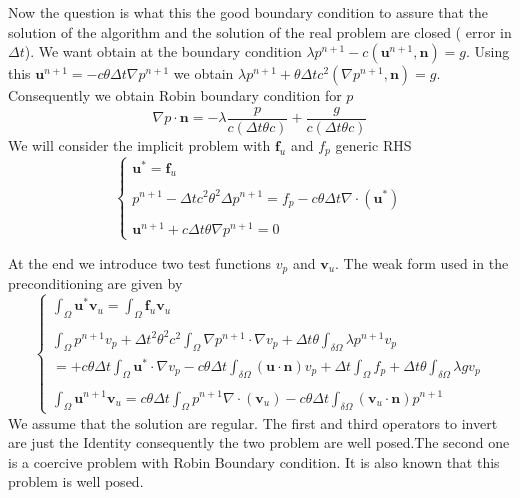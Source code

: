 \documentclass[a4paper,twoside,french,english,11pt]{article}
\newcommand{\ds}{\displaystyle}
\begin{document}
Now the question is what this the good boundary condition to assure that the solution of the algorithm and the solution of the real problem are closed ( error in $\Delta t$). We want obtain at the boundary condition
$\lambda p^{n+1}- c (\bm{u}^{n+1},\bm{n})=g$. Using this $\bm{u}^{n+1}=-c \theta \Delta t\nabla p^{n+1}$ we obtain $\lambda p^{n+1}+ \theta \Delta t c^2 (\nabla p^{n+1},\bm{n})=g$. Consequently we obtain Robin boundary condition for $p$
$$
\nabla p\cdot \bm{n}=-\lambda\frac{p}{c(\Delta t\theta c)}+\frac{g}{c(\Delta t\theta c)}
$$
We will consider the implicit problem with $\mathbf{f}_u$ and $f_p$ generic RHS
$$
\left\{\begin{array}{l}
\ds \bm{u}^{*}= \mathbf{f}_u\\
~\\
\ds p^{n+1}- \Delta t c^2\theta^2\Delta p^{n+1} = f_p-c\theta \Delta t\nabla \cdot (\bm{u}^*) \\
~\\
\ds \bm{u}^{n+1}+c\Delta t\theta \nabla p^{n+1} = 0 \end{array}\right.
$$


At the end we introduce two test functions $v_p$ and $\mathbf{v}_u$. The weak form used in the preconditioning are given by
$$\left\{\begin{array}{l}
\ds \int_{\Omega} \bm{u}^{*} \mathbf{v}_u = \int_{\Omega}\mathbf{f}_u \mathbf{v}_u\\
~\\
\ds \int_{\Omega} p^{n+1} v_p+ \Delta t^2 \theta^2 c^2 \int_{\Omega}\nabla p^{n+1} \cdot \nabla v_p +\Delta t \theta\int_{\delta \Omega} \lambda p^{n+1} v_p\\
= \ds +c\theta\Delta t\int_{\Omega} \bm{u}^* \cdot \nabla v_p -c\theta\Delta t \int_{\delta \Omega} (\bm{u}\cdot\bm{n})v_p + \Delta t\int_{\Omega}f_p+\Delta t \theta \int_{\delta \Omega} \lambda g v_p\\
~\\
\ds \int_{\Omega} \bm{u}^{n+1} \mathbf{v}_u= c\theta\Delta t \int_{\Omega} p^{n+1} \nabla \cdot (\mathbf{v}_u)-c\theta\Delta t \int_{\delta \Omega} (\bm{v}_u\cdot\bm{n})p^{n+1}  \end{array}\right.
$$
We assume that the solution are regular. The first and third operators to invert are just the Identity consequently the two problem are well posed.The second one is a coercive problem with Robin Boundary condition. It is also known that this problem is well posed.
\end{document}
